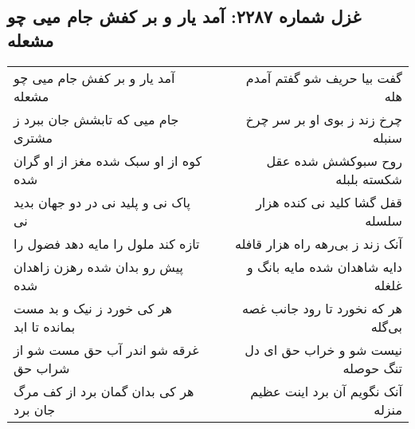 \begin{center}
\section*{غزل شماره ۲۲۸۷: آمد یار و بر کفش جام میی چو مشعله}
\label{sec:2287}
\begin{longtable}{l p{0.5cm} r}
آمد یار و بر کفش جام میی چو مشعله
&&
گفت بیا حریف شو گفتم آمدم هله
\\
جام میی که تابشش جان ببرد ز مشتری
&&
چرخ زند ز بوی او بر سر چرخ سنبله
\\
کوه از او سبک شده مغز از او گران شده
&&
روح سبوکشش شده عقل شکسته بلبله
\\
پاک نی و پلید نی در دو جهان بدید نی
&&
قفل گشا کلید نی کنده هزار سلسله
\\
تازه کند ملول را مایه دهد فضول را
&&
آنک زند ز بی‌رهه راه هزار قافله
\\
پیش رو بدان شده رهزن زاهدان شده
&&
دایه شاهدان شده مایه بانگ و غلغله
\\
هر کی خورد ز نیک و بد مست بمانده تا ابد
&&
هر که نخورد تا رود جانب غصه بی‌گله
\\
غرقه شو اندر آب حق مست شو از شراب حق
&&
نیست شو و خراب حق ای دل تنگ حوصله
\\
هر کی بدان گمان برد از کف مرگ جان برد
&&
آنک نگویم آن برد اینت عظیم منزله
\\
\end{longtable}
\end{center}
